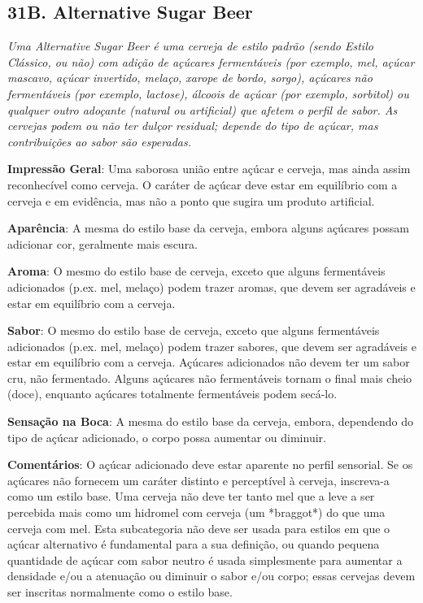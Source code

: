 \subsection*{31B. Alternative Sugar Beer}

\textit{Uma Alternative Sugar Beer é uma cerveja de estilo padrão (sendo Estilo Clássico, ou não) com adição de açúcares fermentáveis (por exemplo, mel, açúcar mascavo, açúcar invertido, melaço, xarope de bordo, sorgo), açúcares não fermentáveis (por exemplo, lactose), álcoois de açúcar (por exemplo, sorbitol) ou qualquer outro adoçante (natural ou artificial) que afetem o perfil de sabor. As cervejas podem ou não ter dulçor residual; depende do tipo de açúcar, mas contribuições ao sabor são esperadas.}

\textbf{Impressão Geral}: Uma saborosa união entre açúcar e cerveja, mas ainda assim reconhecível como cerveja. O caráter de açúcar deve estar em equilíbrio com a cerveja e em evidência, mas não a ponto que sugira um produto artificial.

\textbf{Aparência}: A mesma do estilo base da cerveja, embora alguns açúcares possam adicionar cor, geralmente mais escura.

\textbf{Aroma}: O mesmo do estilo base de cerveja, exceto que alguns fermentáveis adicionados (p.ex. mel, melaço) podem trazer aromas, que devem ser agradáveis e estar em equilíbrio com a cerveja.

\textbf{Sabor}: O mesmo do estilo base de cerveja, exceto que alguns fermentáveis adicionados (p.ex. mel, melaço) podem trazer sabores, que devem ser agradáveis e estar em equilíbrio com a cerveja. Açúcares adicionados não devem ter um sabor cru, não fermentado. Alguns açúcares não fermentáveis tornam o final mais cheio (doce), enquanto açúcares totalmente fermentáveis podem secá-lo.

\textbf{Sensação na Boca}: A mesma do estilo base da cerveja, embora, dependendo do tipo de açúcar adicionado, o corpo possa aumentar ou diminuir.

\textbf{Comentários}: O açúcar adicionado deve estar aparente no perfil sensorial. Se os açúcares não fornecem um caráter distinto e perceptível à cerveja, inscreva-a como um estilo base. Uma cerveja não deve ter tanto mel que a leve a ser percebida mais como um hidromel com cerveja (um *braggot*) do que uma cerveja com mel. Esta subcategoria não deve ser usada para estilos em que o açúcar alternativo é fundamental para a sua definição, ou quando pequena quantidade de açúcar com sabor neutro é usada simplesmente para aumentar a densidade e/ou a atenuação ou diminuir o sabor e/ou corpo; essas cervejas devem ser inscritas normalmente como o estilo base.

